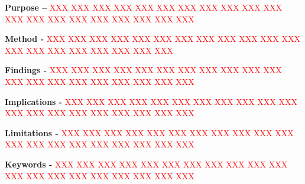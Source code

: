 \noindent\textbf{Purpose –} \textcolor{red}{XXX XXX XXX XXX XXX XXX XXX XXX XXX XXX XXX XXX XXX XXX XXX XXX XXX XXX XXX XXX}

\noindent\textbf{Method -} \textcolor{red}{XXX XXX XXX XXX XXX XXX XXX XXX XXX XXX XXX XXX XXX XXX XXX XXX XXX XXX XXX XXX}

\noindent\textbf{Findings -} \textcolor{red}{XXX XXX XXX XXX XXX XXX XXX XXX XXX XXX XXX XXX XXX XXX XXX XXX XXX XXX XXX XXX}

\noindent\textbf{Implications -} \textcolor{red}{XXX XXX XXX XXX XXX XXX XXX XXX XXX XXX XXX XXX XXX XXX XXX XXX XXX XXX XXX XXX}

\noindent\textbf{Limitations -} \textcolor{red}{XXX XXX XXX XXX XXX XXX XXX XXX XXX XXX XXX XXX XXX XXX XXX XXX XXX XXX XXX XXX}

\noindent\textbf{Keywords -} \textcolor{red}{XXX XXX XXX XXX XXX XXX XXX XXX XXX XXX XXX XXX XXX XXX XXX XXX XXX XXX XXX XXX}
